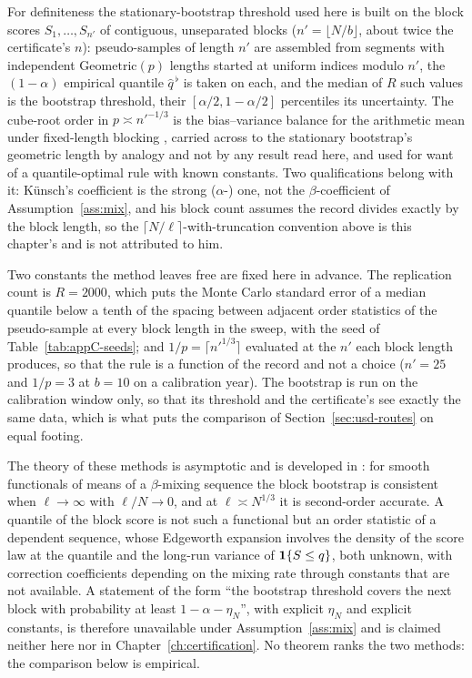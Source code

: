 \documentclass[../../../main.tex]{subfiles}
\begin{document}
For definiteness the stationary-bootstrap threshold used here is built on the block scores $S_1,\dots,S_{n'}$ of contiguous, unseparated blocks ($n'=\lfloor N/b\rfloor$, about twice the certificate's $n$): pseudo-samples of length $n'$ are assembled from segments with independent $\mathrm{Geometric}(p)$ lengths started at uniform indices modulo $n'$, the $(1-\alpha)$ empirical quantile $\hat q^{\,\flat}$ is taken on each, and the median of $R$ such values is the bootstrap threshold, their $[\alpha/2,1-\alpha/2]$ percentiles its uncertainty. The cube-root order in $p\asymp n'^{-1/3}$ is the bias--variance balance for the arithmetic mean under fixed-length blocking \citep[Cor.~3.1, p.~1226]{kunsch1989}, carried across to the stationary bootstrap's geometric length by analogy and not by any result read here, and used for want of a quantile-optimal rule with known constants. Two qualifications belong with it: K\"unsch's coefficient is the strong ($\alpha$-) one, not the $\beta$-coefficient of Assumption~\ref{ass:mix}, and his block count assumes the record divides exactly by the block length, so the $\lceil N/\ell\rceil$-with-truncation convention above is this chapter's and is not attributed to him.

Two constants the method leaves free are fixed here in advance. The replication count is $R=2000$, which puts the Monte Carlo standard error of a median quantile below a tenth of the spacing between adjacent order statistics of the pseudo-sample at every block length in the sweep, with the seed of Table~\ref{tab:appC-seeds}; and $1/p=\lceil n'^{1/3}\rceil$ evaluated at the $n'$ each block length produces, so that the rule is a function of the record and not a choice ($n'=25$ and $1/p=3$ at $b=10$ on a calibration year). The bootstrap is run on the calibration window only, so that its threshold and the certificate's see exactly the same data, which is what puts the comparison of Section~\ref{sec:usd-routes} on equal footing.

The theory of these methods is asymptotic and is developed in \citet{lahiri2003}: for smooth functionals of means of a $\beta$-mixing sequence the block bootstrap is consistent when $\ell\to\infty$ with $\ell/N\to0$, and at $\ell\asymp N^{1/3}$ it is second-order accurate. A quantile of the block score is not such a functional but an order statistic of a dependent sequence, whose Edgeworth expansion involves the density of the score law at the quantile and the long-run variance of $\mathbf{1}\{S\le q\}$, both unknown, with correction coefficients depending on the mixing rate through constants that are not available. A statement of the form ``the bootstrap threshold covers the next block with probability at least $1-\alpha-\eta_N$'', with explicit $\eta_N$ and explicit constants, is therefore unavailable under Assumption~\ref{ass:mix} and is claimed neither here nor in Chapter~\ref{ch:certification}. No theorem ranks the two methods: the comparison below is empirical.
\end{document}
